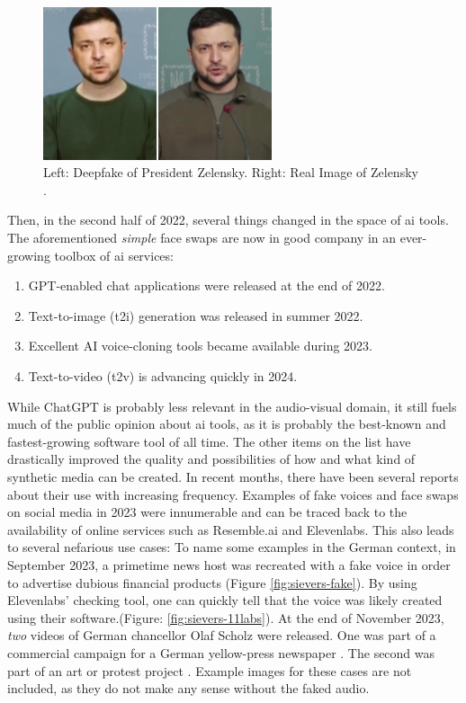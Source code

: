 \documentclass[
  a4paper,  %
  twoside,  %
  bibliography=totoc,
  headsepline,
  cleardoublepage=empty,
  parskip=half,
  draft=false
]{scrbook}
\begin{document}
\begin{figure}[h]
  \centering
  \includegraphics[width=0.6\textwidth]{./graphics/Zelensky.jpg}
  \caption{Left: Deepfake of President Zelensky. Right: Real Image of Zelensky \cite{universityofvirginiaZelenskyySurrenderHoax2022}.}
  \label{fig:zelensky-Deepfake}
\end{figure}

Then, in the second half of 2022, several things changed in the space of \gls{ai} tools. The aforementioned \textit{simple} face swaps are now in good company in an ever-growing toolbox of \gls{ai} services: 
\begin{enumerate}
  \item GPT-enabled chat applications were released at the end of 2022.
  \item Text-to-image (t2i) generation was released in summer 2022.
  \item Excellent AI voice-cloning tools became available during 2023.
  \item Text-to-video (t2v) is advancing quickly in 2024.
\end{enumerate}
While ChatGPT is probably less relevant in the audio-visual domain, it still fuels much of the public opinion about \gls{ai} tools, as it is probably the best-known and fastest-growing software tool of all time. The other items on the list have drastically improved the quality and possibilities of how and what kind of synthetic media can be created. In recent months, there have been several reports about their use with increasing frequency. Examples of fake voices and face swaps on social media in 2023 were innumerable and can be traced back to the availability of online services such as Resemble.ai and Elevenlabs. This also leads to several nefarious use cases: To name some examples in the German context, in September 2023, a primetime news host was recreated with a fake voice in order to advertise dubious financial products (Figure \ref{fig:sievers-fake}). By using Elevenlabs' checking tool, one can quickly tell that the voice was likely created using their software.(Figure: \ref{fig:sievers-11labs}). At the end of November 2023, \textit{two} videos of German chancellor Olaf Scholz were released. One was part of a commercial campaign for a German yellow-press newspaper \cite{dwdl.deSpringerTrommeltMit}. The second was part of an art or protest project \cite{zdfKunstinstallationDeepfakeScholzVerkuendet}. Example images for these cases are not included, as they do not make any sense without the faked audio. 
\end{document}
